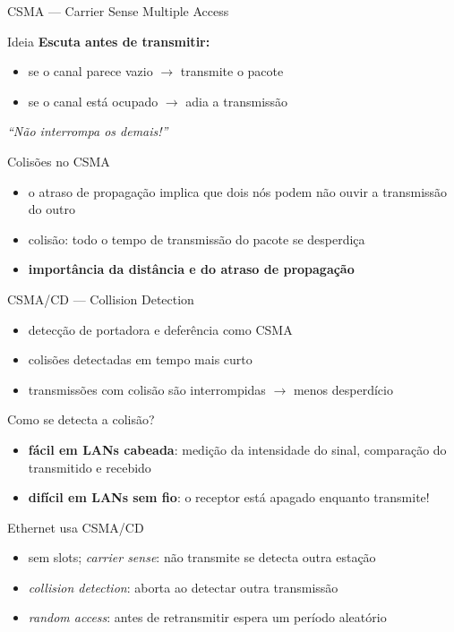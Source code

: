 \documentclass[aspectratio=169,11pt]{beamer}
\begin{document}
\begin{frame}{CSMA --- Carrier Sense Multiple Access}
  \begin{block}{Ideia}
    \textbf{Escuta antes de transmitir:}
    \begin{itemize}
      \item se o canal parece vazio $\rightarrow$ transmite o pacote
      \item se o canal está ocupado $\rightarrow$ adia a transmissão
    \end{itemize}
    \emph{``Não interrompa os demais!''}
  \end{block}
  \begin{block}{Colisões no CSMA}
    \begin{itemize}
      \item o atraso de propagação implica que dois nós podem não ouvir a transmissão do outro
      \item colisão: todo o tempo de transmissão do pacote se desperdiça
      \item \textbf{importância da distância e do atraso de propagação}
    \end{itemize}
  \end{block}
\end{frame}

\begin{frame}{CSMA/CD --- Collision Detection}
  \begin{itemize}
    \item detecção de portadora e deferência como CSMA
    \item colisões detectadas em tempo mais curto
    \item transmissões com colisão são interrompidas $\rightarrow$ menos desperdício
  \end{itemize}
  \begin{block}{Como se detecta a colisão?}
    \begin{itemize}
      \item \textbf{fácil em LANs cabeada}: medição da intensidade do sinal, comparação do transmitido e recebido
      \item \textbf{difícil em LANs sem fio}: o receptor está apagado enquanto transmite!
    \end{itemize}
  \end{block}
  \begin{exampleblock}{Ethernet usa CSMA/CD}
    \begin{itemize}
      \item sem slots; \emph{carrier sense}: não transmite se detecta outra estação
      \item \emph{collision detection}: aborta ao detectar outra transmissão
      \item \emph{random access}: antes de retransmitir espera um período aleatório
    \end{itemize}
  \end{exampleblock}
\end{frame}
\end{document}
